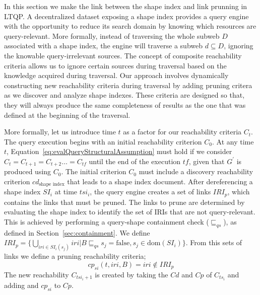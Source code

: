 In this section we make the link between the shape index and link prunning  in LTQP.
A decentralized dataset  exposing a shape index provides a query engine with the opportunity to reduce its search domain by knowing which resources are query-relevant.
More formally, instead of traversing the whole subweb $D$ associated with a shape index, the engine will traverse a subweb $d \subseteq D$, ignoring the knowable query-irrelevant sources.
The concept of composite reachability criteria allows us to ignore certain sources during traversal based on the knowledge acquired during traversal.
Our approach involves dynamically constructing new reachability criteria during traversal by adding pruning critera as we discover and analyze shape indexes.
These criteria are designed so that, they will always produce the same completeness of results as the one that was defined at the beginning of the traversal.

More formally, let us introduce time $t$ as a factor for our reachability criteria $C_t$.
The query execution begins with an initial reachability criterion $C_0$.
At any time $t$, Equation~\ref{eq:evalQueryStructuralAssumption} must hold if we consider $C_t = C_{t+1} = C_{t+2} \dots = C_{tf}$ until the end of the execution $tf$, given that $G^{\prime}$ is produced using $C_0$.
The initial criterion $C_0$ must include a discovery reachability criterion $cd_{\text{shape index}}$ that leads to a shape index document.
After dereferencing a shape index $SI_i$ at time $tsi_i$, the query engine creates a set of links $IRI_p$, which contains the links that must be pruned.
The links to prune are determined by evaluating the shape index to identify the set of IRIs that are not query-relevant.
This is achieved by performing a query-shape containment check ($\sqsubseteq_{qs}$), as defined in Section~\ref{sec:containment}.
We define
$IRI_p = \{ \bigcup_{iri \in SI_i(s_j)} iri | B \sqsubseteq_{qs}  s_j = \mathrm{false}, s_j \in \text{dom}(SI_i) \}$.
From this sets of links we define a pruning reachability criteria;
\begin{equation}
       cp_{si}(t, iri, B) = iri \notin IRI_p
\end{equation}
The new reachability $C_{tsi_i + 1}$ is created by taking the $Cd$ and $Cp$ of $C_{ts_i}$ and adding
and $cp_{si}$ to $Cp$.


